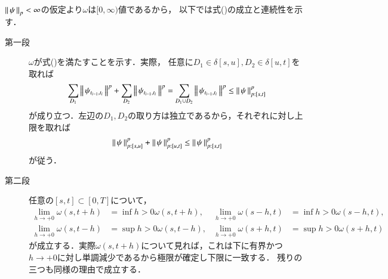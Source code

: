 	\begin{prf}
		$\left\|\, \psi\, \right\|_{p} < \infty$の仮定より$\omega$は$[0,\infty)$値であるから，
		以下では式()の成立と連続性を示す．
		\begin{description}
			\item[第一段]
				$\omega$が式()を満たすことを示す．実際，
				任意に$D_1 \in \delta[s,u],D_2 \in \delta[u,t]$を取れば
				\begin{align}
					\sum_{D_1}\left\|\, \psi_{t_{i-1},t_i}\, \right\|_{}^p
					+ \sum_{D_2}\left\|\, \psi_{t_{i-1},t_i}\, \right\|_{}^p
					= \sum_{D_1 \cup D_2}\left\|\, \psi_{t_{i-1},t_i}\, \right\|_{}^p
					\leq \left\|\, \psi\, \right\|_{p:[s,t]}^p
				\end{align}
				が成り立つ．左辺の$D_1,D_2$の取り方は独立であるから，それぞれに対し上限を取れば
				\begin{align}
					\left\|\, \psi\, \right\|_{p:[s,u]}^p + \left\|\, \psi\, \right\|_{p:[u,t]}^p
					\leq \left\|\, \psi\, \right\|_{p:[s,t]}^p
				\end{align}
				が従う．
			
			\item[第二段]
				任意の$[s,t] \subset [0,T]$について，
				\begin{align}
					\lim_{h \to +0} \omega(s,t+h) &= \inf{h>0}{\omega(s,t+h)},
					&\lim_{h \to +0} \omega(s-h,t) &= \inf{h>0}{\omega(s-h,t)}, \\
					\lim_{h \to +0} \omega(s,t-h) &= \sup{h>0}{\omega(s,t-h)},
					&\lim_{h \to +0} \omega(s+h,t) &= \sup{h>0}{\omega(s+h,t)}
				\end{align}
				が成立する．実際$\omega(s,t+h)$について見れば，これは下に有界かつ
				$h \to +0$に対し単調減少であるから極限が確定し下限に一致する．
				残りの三つも同様の理由で成立する．
				

\end{description}
\end{prf}
